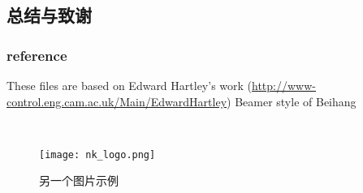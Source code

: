 \documentclass[UTF8]{beamer}
\begin{document}
\subsection{总结与致谢}

\begin{frame}
    \frametitle{reference}
    \begin{thebibliography}{99} 
     These files are based on Edward Hartley's work
        (\url{http://www-control.eng.cam.ac.uk/Main/EdwardHartley})
     Beamer style of Beihang
    \end{thebibliography}
\end{frame}

\begin{frame}
    \\
    \begin{figure}[htb]
	\texttt{[image: nk\_logo.png]}
	\caption{另一个图片示例}
	\label{fig2}
    \end{figure}
\end{frame}
\end{document}
